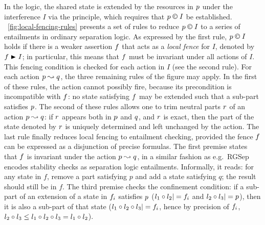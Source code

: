 In the logic, the shared state is extended by the resources in
$\lass{P}$ under the interference $I$ via the \extendRule principle,
which requires that $\lass{P}\containI I$ be
established. \fig~\ref{fig:local-fencing-rules} presents a set of
rules to reduce $\lass{P}\containI I$ to a series of entailments in
ordinary separation logic. As expressed by the first rule,
$\lass{P}\containI I$ holds if there is a weaker assertion $\lass{F}$
that acts as a \emph{local fence} for $I$, denoted by
$\lass{F}\strictfences I$; in particular, this means that $\lass{F}$
must be invariant under all actions of $I$. This fencing condition is
checked for each action in $I$ (see the second rule). For each action
$\lass{P}\swap \lass{Q}$, the three remaining rules of the figure may
apply. In the first of these rules, the action cannot possibly fire,
because its precondition is incompatible with $\lass{F}$: no state
satisfying $\lass{F}$ may be extended such that a sub-part satisfies
$\lass{P}$. The second of these rules allows one to trim neutral parts
$\lass{R}$ of an action $\lass{P}\swap \lass{Q}$: if $\lass{R}$
appears both in $\lass{P}$ and $\lass{Q}$, and $\lass{R}$ is exact,
then the part of the state denoted by $\lass{R}$ is uniquely
determined and left unchanged by the action. The last rule finally
reduces local fencing to entailment checking, provided the fence
$\lass{F}$ can be expressed as a disjunction of precise formulas. The
first premise states that $\lass{F}$ is invariant under the action
$\lass{P}\swap \lass{Q}$, in a similar fashion as e.g.\ RGSep encodes
stability checks as separation logic entailments. Informally, it
reads: for any state in $f$, remove a part satisfying $p$ and add a
state satisfying $q$; the result should still be in $f$. The third
premise checks the confinement condition: if a sub-part of an
extension of a state in $\lass{F}_i$ satisfies $\lass{P}$
($l_1\composeL l_2|= \lass{F}_i$ and $l_2\composeL l_3 |= \lass{P}$),
then it is also a sub-part of that state ($l_1\composeL l_2\composeL
l_3|=\lass{F}_i$, hence by precision of $\lass{F}_i$, $l_2\circ
l_3\leq l_1\circ l_2\circ l_3 = l_1\circ l_2$).

